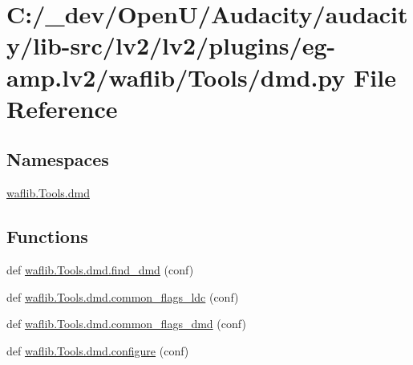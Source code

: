 \hypertarget{lv2_2plugins_2eg-amp_8lv2_2waflib_2_tools_2dmd_8py}{}\section{C\+:/\+\_\+dev/\+Open\+U/\+Audacity/audacity/lib-\/src/lv2/lv2/plugins/eg-\/amp.lv2/waflib/\+Tools/dmd.py File Reference}
\label{lv2_2plugins_2eg-amp_8lv2_2waflib_2_tools_2dmd_8py}
\subsection*{Namespaces}
\begin{DoxyCompactItemize}
\item 
 \hyperlink{namespacewaflib_1_1_tools_1_1dmd}{waflib.\+Tools.\+dmd}
\end{DoxyCompactItemize}
\subsection*{Functions}
\begin{DoxyCompactItemize}
\item 
def \hyperlink{namespacewaflib_1_1_tools_1_1dmd_a4325581bb5714f5478adf1c1c00ca3cd}{waflib.\+Tools.\+dmd.\+find\+\_\+dmd} (conf)
\item 
def \hyperlink{namespacewaflib_1_1_tools_1_1dmd_a491ac92b35c587c124f8738a31c30cd9}{waflib.\+Tools.\+dmd.\+common\+\_\+flags\+\_\+ldc} (conf)
\item 
def \hyperlink{namespacewaflib_1_1_tools_1_1dmd_a418d35f6869615d32f9b91891f3d1d7c}{waflib.\+Tools.\+dmd.\+common\+\_\+flags\+\_\+dmd} (conf)
\item 
def \hyperlink{namespacewaflib_1_1_tools_1_1dmd_a9ba96fbd5fe75ddd056e372285afa6e9}{waflib.\+Tools.\+dmd.\+configure} (conf)
\end{DoxyCompactItemize}
